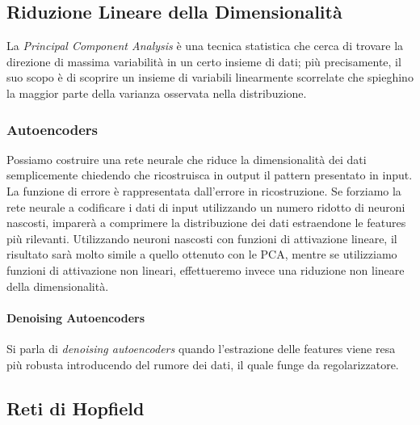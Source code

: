 \documentclass[12pt, a4paper]{article}
\begin{document}
\subsection{Riduzione Lineare della Dimensionalità}
La \textit{Principal Component Analysis} è una tecnica statistica che cerca di trovare la direzione di massima variabilità in un certo insieme di dati; più precisamente, il suo scopo è di scoprire un insieme di variabili linearmente scorrelate che spieghino la maggior parte della varianza osservata nella distribuzione.
\subsubsection{Autoencoders}
Possiamo costruire una rete neurale che riduce la dimensionalità dei dati semplicemente chiedendo che ricostruisca in output il pattern presentato in input. La funzione di errore è rappresentata dall'errore in ricostruzione.
Se forziamo la rete neurale a codificare i dati di input utilizzando un numero ridotto di neuroni nascosti, imparerà a comprimere la distribuzione dei dati estraendone le features più rilevanti.
Utilizzando neuroni nascosti con funzioni di attivazione lineare, il risultato sarà molto simile a quello ottenuto con le PCA, mentre se utilizziamo funzioni di attivazione non lineari, effettueremo invece una riduzione non lineare della dimensionalità.

\paragraph{Denoising Autoencoders} Si parla di \textit{denoising autoencoders} quando l'estrazione delle features viene resa più robusta introducendo del rumore dei dati, il quale funge da regolarizzatore.

\subsection{Reti di Hopfield}
\end{document}
